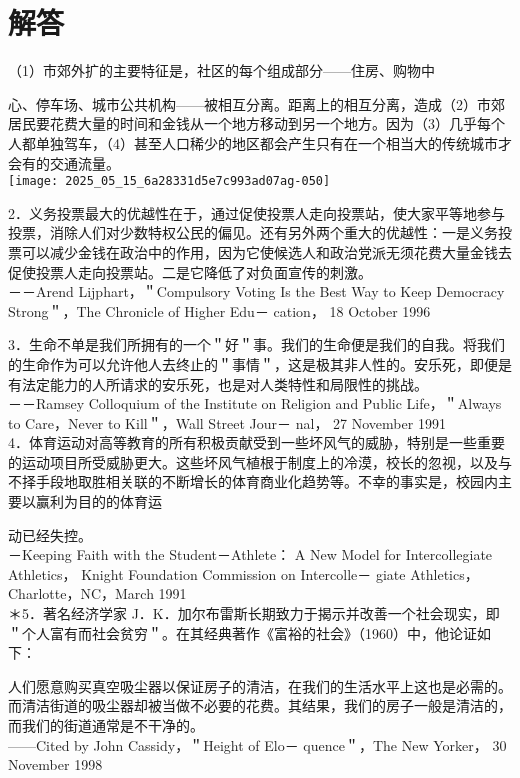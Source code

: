 \section*{解答}
（1）市郊外扩的主要特征是，社区的每个组成部分——住房、购物中

心、停车场、城市公共机构——被相互分离。距离上的相互分离，造成（2）市郊居民要花费大量的时间和金钱从一个地方移动到另一个地方。因为（3）几乎每个人都单独驾车，（4）甚至人口稀少的地区都会产生只有在一个相当大的传统城市才会有的交通流量。\\
\texttt{[image: 2025\_05\_15\_6a28331d5e7c993ad07ag-050]}

2．义务投票最大的优越性在于，通过促使投票人走向投票站，使大家平等地参与投票，消除人们对少数特权公民的偏见。还有另外两个重大的优越性：一是义务投票可以减少金钱在政治中的作用，因为它使候选人和政治党派无须花费大量金钱去促使投票人走向投票站。二是它降低了对负面宣传的刺激。\\
－－Arend Lijphart，＂Compulsory Voting Is the Best Way to Keep Democracy Strong＂，The Chronicle of Higher Edu－ cation， 18 October 1996

3．生命不单是我们所拥有的一个＂好＂事。我们的生命便是我们的自我。将我们的生命作为可以允许他人去终止的＂事情＂，这是极其非人性的。安乐死，即便是有法定能力的人所请求的安乐死，也是对人类特性和局限性的挑战。\\
－－Ramsey Colloquium of the Institute on Religion and Public Life，＂Always to Care，Never to Kill＂，Wall Street Jour－ nal， 27 November 1991\\
4．体育运动对高等教育的所有积极贡献受到一些坏风气的威胁，特别是一些重要的运动项目所受威胁更大。这些坏风气植根于制度上的冷漠，校长的忽视，以及与不择手段地取胜相关联的不断增长的体育商业化趋势等。不幸的事实是，校园内主要以赢利为目的的体育运

动已经失控。\\
－Keeping Faith with the Student－Athlete： A New Model for Intercollegiate Athletics， Knight Foundation Commission on Intercolle－ giate Athletics，Charlotte，NC，March 1991\\
＊5．著名经济学家 J．K．加尔布雷斯长期致力于揭示并改善一个社会现实，即＂个人富有而社会贫穷＂。在其经典著作《富裕的社会》（1960）中，他论证如下：

人们愿意购买真空吸尘器以保证房子的清洁，在我们的生活水平上这也是必需的。而清洁街道的吸尘器却被当做不必要的花费。其结果，我们的房子一般是清洁的，而我们的街道通常是不干净的。\\
——Cited by John Cassidy，＂Height of Elo－ quence＂，The New Yorker， 30 November 1998

